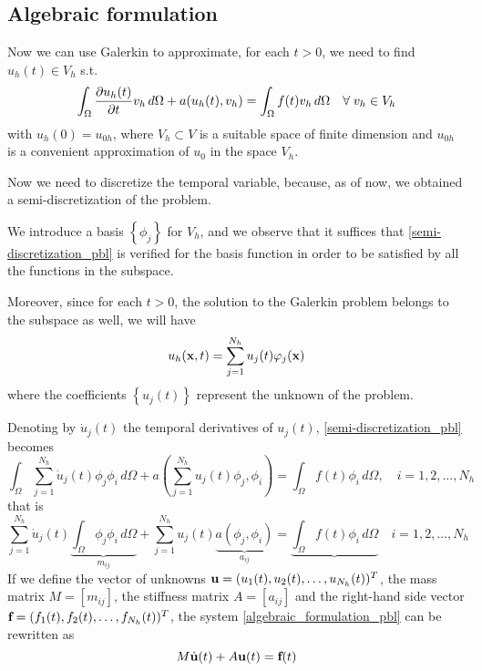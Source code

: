 \subsection{Algebraic formulation}
Now we can use Galerkin to approximate, for each \(t > 0\), we need to find \(u_h(t) \in V_h\) s.t. 
\begin{equation}
    \int_\Omega \partialderivative{u_h(t)}{t} v_h \, d\Omega + a(u_h(t), v_h) = \int_\Omega f(t)v_h \, d\Omega \quad \forall \; v_h \in V_h
\label{semi-discretization_pbl}
\end{equation}
with \(u_h(0) = u_{0h}\), where \(V_h \subset V\) is a suitable space of finite dimension and \(u_{0h}\) is a convenient approximation of \(u_0\) in the space \(V_h\).

Now we need to discretize the temporal variable, because, as of now, we obtained a semi-discretization of the problem.

We introduce a basis \(\left\{ \phi_j \right\}\) for \(V_h\), and we observe that it suffices that \eqref{semi-discretization_pbl} is verified for the basis function in order to be satisfied by all the functions in the subspace. 

Moreover, since for each \(t > 0\), the solution to the Galerkin problem belongs to the subspace as well, we will have
\[
    u_h(\textbf{x}, t) = \sum_{j=1}^{N_h} u_j(t)\varphi_j(\textbf{x})
\]
where the coefficients \(\left\{ u_j(t) \right\}\) represent the unknown of the problem. 

Denoting by \(\dot{u}_j(t)\) the temporal derivatives of \(u_j(t)\), \eqref{semi-discretization_pbl} becomes
\[
    \int_\Omega \sum_{j=1}^{N_h} \dot{u}_j(t) \phi_j\phi_i \, d\Omega + a\left( \sum_{j=1}^{N_h} u_j(t)\phi_j, \phi_i \right) = \int_\Omega f(t)\phi_i \, d\Omega, \quad i = 1,2,\ldots, N_h
\]
that is 
\begin{equation}
    \sum_{j=1}^{N_h} \dot{u}_j(t) \underbrace{\int_\Omega \phi_j \phi_i \, d\Omega}_{m_{ij}} + \sum_{j=1}^{N_h} u_j(t) \underbrace{a(\phi_j, \phi_i)}_{a_{ij}} = \underbrace{\int_\Omega f(t)\phi_i \, d\Omega} \quad i = 1,2,\ldots, N_h
    \label{algebraic_formulation_pbl}
\end{equation}
If we define the vector of unknowns \(\textbf{u} = (u_1(t), u_2(t), \ldots, u_{N_h}(t))^T\), the mass matrix \(M = [m_{ij}]\), the stiffness matrix \(A = [a_{ij}]\) and the right-hand side vector \(\textbf{f} = (f_1(t), f_2(t), \ldots, f_{N_h}(t))^T\), the system \eqref{algebraic_formulation_pbl} can be rewritten as 
\[
    M\dot{\textbf{u}}(t) + A\textbf{u}(t) = \textbf{f}(t)
\]
